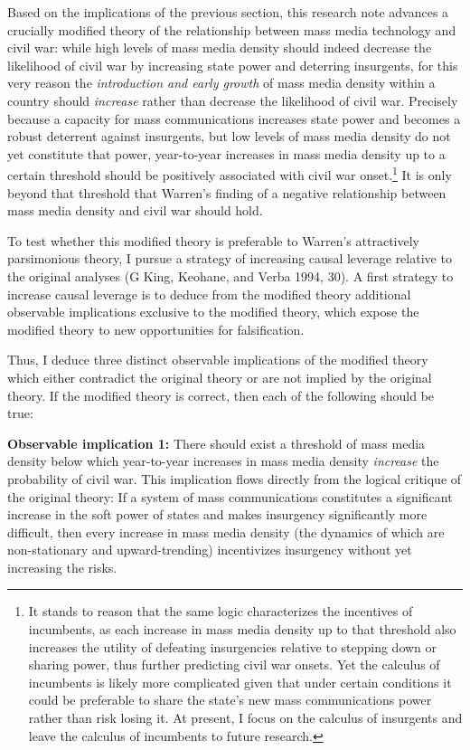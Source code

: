 \documentclass[11pt,article,oneside]{memoir}
\begin{document}
Based on the implications of the previous section, this research note
advances a crucially modified theory of the relationship between mass
media technology and civil war: while high levels of mass media density
should indeed decrease the likelihood of civil war by increasing state
power and deterring insurgents, for this very reason the
\emph{introduction and early growth} of mass media density within a
country should \emph{increase} rather than decrease the likelihood of
civil war. Precisely because a capacity for mass communications
increases state power and becomes a robust deterrent against insurgents,
but low levels of mass media density do not yet constitute that power,
year-to-year increases in mass media density up to a certain threshold
should be positively associated with civil war onset.\footnote{It stands
  to reason that the same logic characterizes the incentives of
  incumbents, as each increase in mass media density up to that
  threshold also increases the utility of defeating insurgencies
  relative to stepping down or sharing power, thus further predicting
  civil war onsets. Yet the calculus of incumbents is likely more
  complicated given that under certain conditions it could be preferable
  to share the state's new mass communications power rather than risk
  losing it. At present, I focus on the calculus of insurgents and leave
  the calculus of incumbents to future research.} It is only beyond that
threshold that Warren's finding of a negative relationship between mass
media density and civil war should hold.

To test whether this modified theory is preferable to Warren's
attractively parsimonious theory, I pursue a strategy of increasing
causal leverage relative to the original analyses (G King, Keohane, and
Verba 1994, 30). A first strategy to increase causal leverage is to
deduce from the modified theory additional observable implications
exclusive to the modified theory, which expose the modified theory to
new opportunities for falsification.

Thus, I deduce three distinct observable implications of the modified
theory which either contradict the original theory or are not implied by
the original theory. If the modified theory is correct, then each of the
following should be true:

\textbf{Observable implication 1:} There should exist a threshold of
mass media density below which year-to-year increases in mass media
density \emph{increase} the probability of civil war. This implication
flows directly from the logical critique of the original theory: If a
system of mass communications constitutes a significant increase in the
soft power of states and makes insurgency significantly more difficult,
then every increase in mass media density (the dynamics of which are
non-stationary and upward-trending) incentivizes insurgency without yet
increasing the risks.
\end{document}
